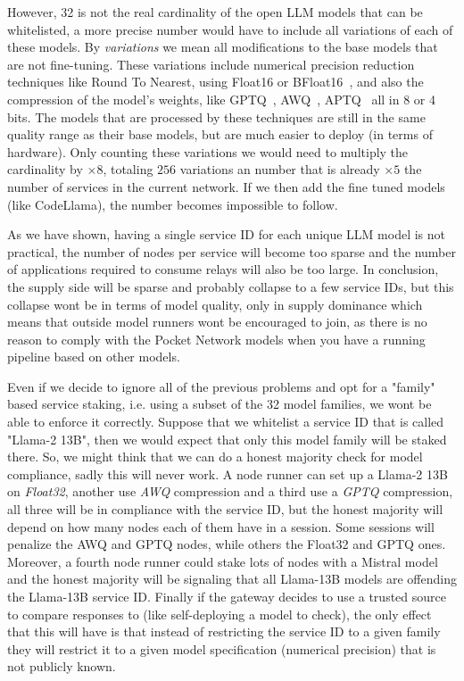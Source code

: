 However, 32 is not the real cardinality of the open \gls{LLM} models that can be whitelisted, a more precise number would have to include all variations of each of these models. By \emph{variations} we mean all modifications to the base models that are not fine-tuning. These variations include numerical precision reduction techniques like Round To Nearest, using Float16 or BFloat16~\cite{kalamkar2019study}, and also the compression of the model's weights, like  GPTQ~\cite{frantar2022gptq}, AWQ~\cite{lin2023awq}, APTQ~\cite{guan2024aptq} all in 8 or 4 bits. The models that are processed by these techniques are still in the same quality range as their base models, but are much easier to deploy (in terms of hardware). Only counting these variations we would need to multiply the cardinality by $\times8$, totaling $256$ variations an number that is already $\times5$ the number of services in the current network.
If we then add the fine tuned models (like CodeLlama), the number becomes impossible to follow.

As we have shown, having a single service ID for each unique \gls{LLM} model is not practical, the number of nodes per service will become too sparse and the number of applications required to consume relays will also be too large. In conclusion, the supply side will be sparse and probably collapse to a few service IDs, but this collapse wont be in terms of model quality, only in supply dominance which means that outside model runners wont be encouraged to join, as there is no reason to comply with the Pocket Network models when you have a running pipeline based on other models.

Even if we decide to ignore all of the previous problems and opt for a "family" based service staking, i.e. using a subset of the 32 model families, we wont be able to enforce it correctly. Suppose that we whitelist a service ID that is called "Llama-2 13B", then we would expect that only this model family will be staked there. So, we might think that we can do a honest majority check for model compliance, sadly this will never work. A node runner can set up a Llama-2 13B on \emph{Float32}, another use \emph{AWQ} compression and a third use a \emph{GPTQ} compression, all three will be in compliance with the service ID, but the honest majority will depend on how many nodes each of them have in a session. Some sessions will penalize the AWQ and GPTQ nodes, while others the Float32 and GPTQ ones. Moreover, a fourth node runner could stake lots of nodes with a Mistral model and the honest majority will be signaling that all Llama-13B models are offending the Llama-13B service ID. Finally if the gateway decides to use a trusted source to compare responses to (like self-deploying a model to check), the only effect that this will have is that instead of restricting the service ID to a given family they will restrict it to a given model specification (numerical precision) that is not publicly known.

